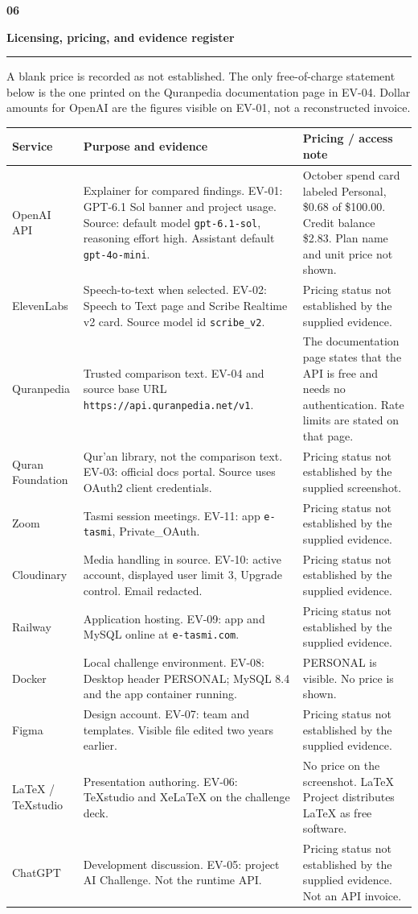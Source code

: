 \documentclass[10.5pt]{article}
\newcommand{\secno}[2]{%
  {\sffamily\bfseries\fontsize{10}{12}\selectfont\color{teal}#1}\par\vspace{0.4mm}%
  {\sffamily\bfseries\fontsize{15.5}{18}\selectfont\color{navy}#2}\par\vspace{1mm}%
  {\color{teal}\rule{\textwidth}{0.7pt}}\par\vspace{1.6mm}%
}
\begin{document}
\clearpage
\secno{06}{Licensing, pricing, and evidence register}

A blank price is recorded as not established. The only free-of-charge statement below is the one printed on the Quranpedia documentation page in EV-04. Dollar amounts for OpenAI are the figures visible on EV-01, not a reconstructed invoice.

{\fontsize{8}{10}\selectfont
\renewcommand{\arraystretch}{1.18}
\begin{tabularx}{\textwidth}{@{}>{\raggedright\arraybackslash}p{2.35cm} >{\raggedright\arraybackslash}X >{\raggedright\arraybackslash}p{3.55cm}@{}}
\toprule
\textbf{Service} & \textbf{Purpose and evidence} & \textbf{Pricing / access note} \\
\midrule
OpenAI API &
Explainer for compared findings. EV-01: GPT-6.1 Sol banner and project usage. Source: default model \texttt{gpt-6.1-sol}, reasoning effort high. Assistant default \texttt{gpt-4o-mini}. &
October spend card labeled Personal, \$0.68 of \$100.00. Credit balance \$2.83. Plan name and unit price not shown. \\
ElevenLabs &
Speech-to-text when selected. EV-02: Speech to Text page and Scribe Realtime v2 card. Source model id \texttt{scribe\_v2}. &
Pricing status not established by the supplied evidence. \\
Quranpedia &
Trusted comparison text. EV-04 and source base URL \texttt{https://api.quranpedia.net/v1}. &
The documentation page states that the API is free and needs no authentication. Rate limits are stated on that page. \\
Quran Foundation &
Qur'an library, not the comparison text. EV-03: official docs portal. Source uses OAuth2 client credentials. &
Pricing status not established by the supplied screenshot. \\
Zoom &
Tasmi session meetings. EV-11: app \texttt{e-tasmi}, Private\_OAuth. &
Pricing status not established by the supplied evidence. \\
Cloudinary &
Media handling in source. EV-10: active account, displayed user limit 3, Upgrade control. Email redacted. &
Pricing status not established by the supplied evidence. \\
Railway &
Application hosting. EV-09: app and MySQL online at \texttt{e-tasmi.com}. &
Pricing status not established by the supplied evidence. \\
Docker &
Local challenge environment. EV-08: Desktop header PERSONAL; MySQL 8.4 and the app container running. &
PERSONAL is visible. No price is shown. \\
Figma &
Design account. EV-07: team and templates. Visible file edited two years earlier. &
Pricing status not established by the supplied evidence. \\
LaTeX / TeXstudio &
Presentation authoring. EV-06: TeXstudio and XeLaTeX on the challenge deck. &
No price on the screenshot. LaTeX Project distributes LaTeX as free software. \\
ChatGPT &
Development discussion. EV-05: project AI Challenge. Not the runtime API. &
Pricing status not established by the supplied evidence. Not an API invoice. \\
\bottomrule
\end{tabularx}
}
\end{document}

